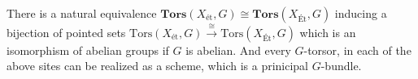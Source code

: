 \begin{cor}
    There is a natural equivalence $\mathbf{Tors}(X_{\mathrm{\text{\'et}}}, G) \cong \mathbf{Tors}(X_{\text{\'Et}}, G)$ 
    inducing a bijection of pointed sets $\mathrm{Tors}(X_{\text{\'et}}, G) \xrightarrow{\cong} \mathrm{Tors}(X_{\text{\'Et}}, G)$ 
    which is an isomorphism of abelian groups if $G$ is abelian.
    And every $G$-torsor, in each of the above sites can be realized as a scheme, which is a prinicipal $G$-bundle.
\end{cor}







